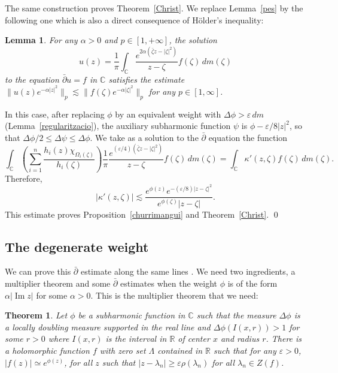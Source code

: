 \documentclass[12pt,twoside,final,psamsfonts]{amsart}
\theoremstyle{plain}
\newtheorem{teor}{Theorem}
\newtheorem{lema}{Lemma}
\theoremstyle{remark}
\theoremstyle{definition}
\newcommand{\C}{{\mathbb C}}
\newcommand{\R}{{\mathbb R}}
\newcommand{\dbar}{\bar\partial}
\renewcommand{\Im}{\operatorname{Im}}
\begin{document}
The same construction proves Theorem~\ref{Christ}. We  replace 
Lemma~\ref{pes} by the following one which is also a direct consequence of
H\"older's inequality:

\begin{lema}
For any $\alpha>0$ and $p\in[1,+\infty]$, the solution
\[
u(z)=\frac 1\pi \int_{\C}\frac{e^{2\alpha(\bar\zeta z -|\zeta|^2)}}{z-\zeta}
f(\zeta)\, dm(\zeta)
\]
to the equation $\dbar u=f$ in $\C$ satisfies the estimate 
$\|u(z)e^{-\alpha|z|^2}\|_p\lesssim \|f(\zeta)e^{-\alpha|\zeta|^2}\|_p$ for any
$p\in [1,\infty]$. 
\end{lema}

In this case, after replacing $\phi$ by an equivalent weight with
$\Delta\phi>\varepsilon\,dm$ (Lemma~\ref{regularitzacio}), the auxiliary subharmonic function $\psi$ is  $\phi-\varepsilon/8
|z|^2$, so that $\Delta\phi/2\le\Delta\psi\le\Delta\phi$. We take as a solution to the $\bar\partial$ equation the function
\[
\int_\C \left( \sum_{i=1}^n
\frac{h_i(z)\chi_{\Omega_i(\zeta)}}{h_i(\zeta)}\right)
 \frac 1\pi \frac{e^{(\varepsilon/4)(\bar\zeta z -|\zeta|^2)}}{z-\zeta}
f(\zeta)\,dm(\zeta)=\int_\C \kappa'(z,\zeta)f(\zeta)\, dm(\zeta).
\]
Therefore,
\[
|\kappa'(z,\zeta)|\lesssim  \frac{e^{\phi(z)}e^{-(\varepsilon/8)|z-\zeta|^2}}
{e^{\phi(\zeta)}|z-\zeta|}.
\]
This estimate proves Proposition~\ref{churrimangui} and Theorem~\ref{Christ}.
\qed

\subsection{The degenerate weight} 
We can prove this $\dbar$ estimate along the same lines . We need two
ingredients, a multiplier theorem and some $\dbar$ estimates when the weight
$\phi$ is of the form $\alpha |\Im z|$ for some $\alpha>0$. This is the
multiplier theorem that we need:

\begin{teor}\label{multreal}
Let $\phi$ be a subharmonic function in $\C$ such that the measure $\Delta
\phi$ is a locally 
doubling measure supported in the real line and  $\Delta \phi
(I(x,r))>1$ for some $r>0$ where $I(x,r)$ is the interval in $\R$ of center $x$
and radius $r$. There is a holomorphic function $f$ with zero set 
$\Lambda$
contained in $\R$ such that for any $\varepsilon>0$, $|f(z)|\simeq
e^{\phi(z)}$, for all $z$ such that 
$|z-\lambda_n|\ge \varepsilon \rho(\lambda_n)$ for all
$\lambda_n\in Z(f)$.
\end{teor}
\end{document}

